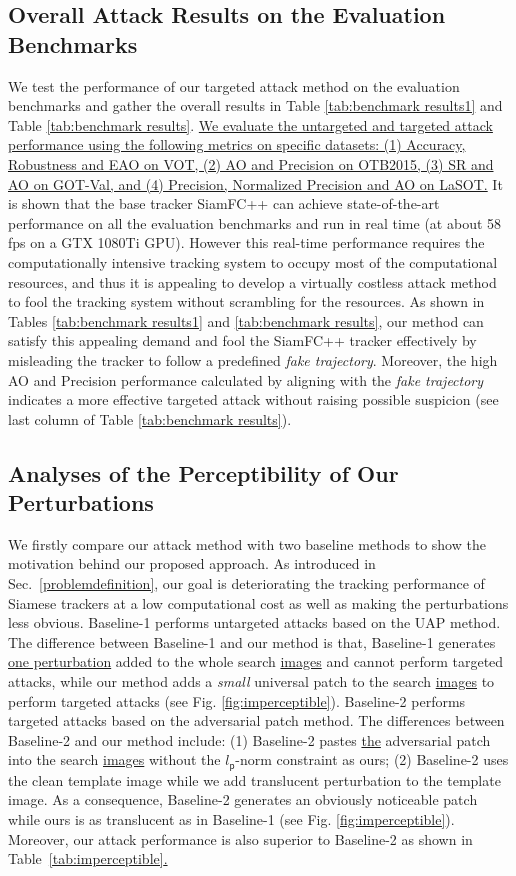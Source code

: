 \documentclass[journal]{IEEEtran}
\begin{document}
\subsection{Overall Attack Results on the Evaluation Benchmarks}

We test the performance of our targeted attack method on the evaluation benchmarks and gather the overall results in Table \ref{tab:benchmark results1} and Table \ref{tab:benchmark results}. \uline{We evaluate the untargeted and targeted attack performance using the following metrics on specific datasets: (1) Accuracy, Robustness and EAO on VOT, (2) AO and Precision on OTB2015, (3) SR and AO on GOT-Val, and (4) Precision, Normalized Precision and AO on LaSOT.} It is shown that the base tracker SiamFC++ can achieve state-of-the-art performance on all the evaluation benchmarks and run in real time (at about 58 fps on a GTX 1080Ti GPU). However this real-time performance requires the computationally intensive tracking system to occupy most of the computational resources, and thus it is appealing to develop a virtually costless attack method to fool the tracking system without scrambling for the resources. As shown in Tables \ref{tab:benchmark results1} and \ref{tab:benchmark results}, our method can satisfy this appealing demand and fool the SiamFC++ tracker effectively by misleading the tracker to follow a predefined \textit{fake trajectory}. Moreover, the high AO and Precision performance calculated by aligning with the \textit{fake trajectory} indicates a more effective targeted attack without raising possible suspicion (see last column of Table \ref{tab:benchmark results}).

\subsection{Analyses of the Perceptibility of Our Perturbations}
We firstly compare our attack method with two baseline methods to show the motivation behind our proposed approach. As introduced in Sec.~\ref{problemdefinition}, our goal is deteriorating the tracking performance of Siamese trackers at a low computational cost as well as making the perturbations less obvious.
Baseline-1 performs untargeted attacks based on the UAP \cite{UAP} method. The difference between Baseline-1 and our method is that, Baseline-1 generates \uline{one perturbation} added to the whole search \uline{images} and cannot perform targeted attacks, while our method adds a \textit{small} universal patch to the search \uline{images} to perform targeted attacks (see Fig. \ref{fig:imperceptible}). Baseline-2 performs targeted attacks based on the adversarial patch \cite{patch} method. The differences between Baseline-2 and our method include: (1) Baseline-2 pastes \uline{the} adversarial patch into the search \uline{images} without the $l_{\mathsf{p}}\text{-norm}$ constraint as ours; (2) Baseline-2 uses the clean template image while we add translucent perturbation to the template image. As a consequence, Baseline-2 generates an obviously noticeable patch while ours is as translucent as in Baseline-1 (see Fig. \ref{fig:imperceptible}). Moreover, our attack performance is also superior to Baseline-2 as shown in Table~\ref{tab:imperceptible}\uline{.}
\end{document}
